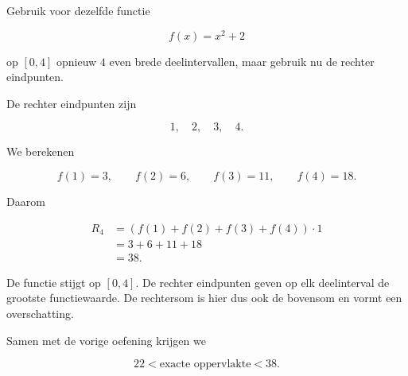 \documentclass{ximera}
\begin{document}
\begin{oefening}{\oefB\ESS}

Gebruik voor dezelfde functie

\[
f(x)=x^2+2
\]

op \([0,4]\) opnieuw \(4\) even brede deelintervallen, maar gebruik nu
de rechter eindpunten.

\begin{oplossing}
De rechter eindpunten zijn

\[
1,\quad2,\quad3,\quad4.
\]

We berekenen

\[
f(1)=3,\qquad
f(2)=6,\qquad
f(3)=11,\qquad
f(4)=18.
\]

Daarom

\[
\begin{aligned}
R_4
&=
\left(f(1)+f(2)+f(3)+f(4)\right)\cdot1\\
&=3+6+11+18\\
&=\boxed{38}.
\end{aligned}
\]

De functie stijgt op \([0,4]\). De rechter eindpunten geven op elk
deelinterval de grootste functiewaarde. De rechtersom is hier dus ook
de bovensom en vormt een overschatting.

Samen met de vorige oefening krijgen we

\[
\boxed{22<\text{exacte oppervlakte}<38}.
\]
\end{oplossing}

\end{oefening}


\end{document}
